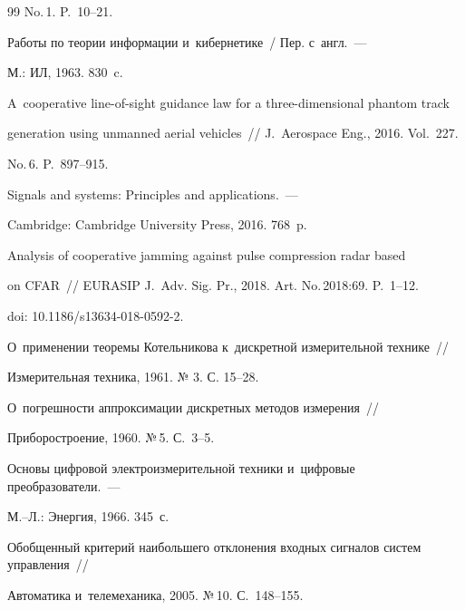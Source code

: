 {{\begin{thebibliography}{99}
No.\,1. P.~10--21.




 Работы по теории информации и~кибернетике~/ Пер. с~англ.~--- 


М.: ИЛ, 1963. 830~c. 









A~cooperative line-of-sight guidance law for a three-dimensional phantom track 


generation using unmanned aerial vehicles~/\!\!/ J.~Aerospace Eng., 2016. Vol.~227. 


No.\,6. P.~897--915. 




 Signals and systems: Principles and applications.~--- 


Cambridge: Cambridge University Press, 2016.  768~p.




Analysis of cooperative jamming against pulse compression radar based


 on CFAR~/\!\!/ EURASIP  J.~Adv. Sig. Pr., 2018. Art. No.\,2018:69. P.~1--12. 


 doi: 10.1186/s13634-018-0592-2.




 О~применении теоремы Котельникова к~дискретной измерительной технике~/\!\!/ 


Измерительная техника, 1961. № 3. С. 15--28.




 О~погрешности аппроксимации дискретных методов измерения~/\!\!/ 


Приборостроение,  1960. №\,5. С.~3--5.




 Основы цифровой электроизмерительной техники и~цифровые преобразователи.~--- 


   М.--Л.: Энергия, 1966. 345~с.




 Обобщенный критерий наибольшего отклонения входных сигналов систем управления~/\!\!/ 


Автоматика и~телемеханика, 2005. №\,10. С.~148--155. 



\end{thebibliography}}}
